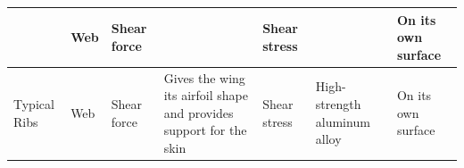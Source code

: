 \begin{table}
{\begin{tabular}{lllllll}
                                        & Web      & Shear force            &                                                                                                                        & Shear stress                                         &                                               & On its own surface                                                       \\
                                \midrule
    Typical Ribs                        & Web      & Shear force            & Gives the wing its airfoil shape and provides support for the skin                                                     & Shear stress                                         & High-strength aluminum alloy                  & On its own surface                                                       \\

\end{tabular}}
\end{table}
